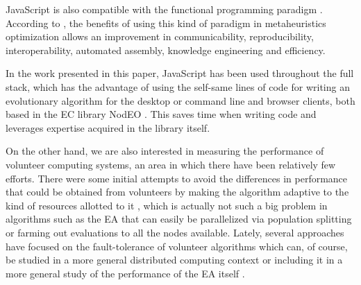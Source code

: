 \documentclass[journal,onecolumn]{IEEEtran}
\begin{document}
JavaScript is also compatible with the functional programming paradigm \cite{Cousineau1998,MacLennan1990,Thompson1996}. 
According to \cite{swanresearch2015}, the benefits of using this kind of paradigm in 
metaheuristics optimization allows an improvement in communicability, 
reproducibility, interoperability, automated assembly, knowledge engineering 
and efficiency. 

In the work presented in this paper, JavaScript has been used throughout the full 
stack, which has the advantage of using the self-same lines of code for
writing an evolutionary algorithm for the
desktop or command line and browser clients, both based in the EC
library NodEO \cite{DBLP:conf/gecco/GuervosVGES14}. This saves time %
when writing code and leverages %
expertise acquired in the library itself. %



On the other hand, we are also interested in measuring the performance
of volunteer computing systems, an area in which there have been
relatively few efforts.  
There were some initial attempts to avoid the differences in performance
that could be obtained from volunteers  by making
the algorithm adaptive to the kind of resources allotted to it
\cite{milani2004online}, which is actually not such a big problem in
algorithms such as the EA that can easily be
parallelized via population splitting or farming out evaluations to all
the nodes available. Lately, several approaches have focused on the
fault-tolerance of volunteer algorithms
\cite{gonzalez2010characterizing} which can, of course, be studied in
a more general distributed computing context
\cite{nogueras2015studying} or including it in a more general study of the
performance of the EA itself
\cite{DBLP:journals/gpem/LaredoBGVAGF14}. 

\end{document}
